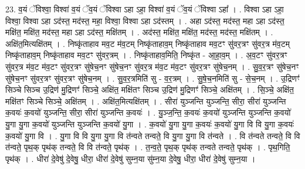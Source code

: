 \documentclass[17pt]{extarticle}
\begin{document}
23. व॒यं ॅविश्वा॒ विश्वा॑ व॒यं ॅव॒यं ॅविश्वा ऽहा ऽहा॒ विश्वा॑ व॒यं ॅव॒यं ॅविश्वा ऽहा᳚ । . विश्वा ऽहा ऽहा॒ विश्वा॒ विश्वा ऽहा ऽद॑स्त॒ मद॑स्त॒ महा॒ विश्वा॒ विश्वा ऽहा ऽद॑स्तम् । . अहा ऽद॑स्त॒ मद॑स्त॒ महा ऽहा ऽद॑स्त॒ मक्षि॑त॒ मक्षि॑त॒ मद॑स्त॒ महा ऽहा ऽद॑स्त॒ मक्षि॑तम् । . अद॑स्त॒ मक्षि॑त॒ मक्षि॑त॒ मद॑स्त॒ मद॑स्त॒ मक्षि॑तम् । . अक्षि॑त॒मित्यक्षि॑तम् । . निष्कृ॑ताहाव मव॒ट म॑व॒टम् निष्कृ॑ताहाव॒म् निष्कृ॑ताहाव मव॒टꣳ सु॑वर॒त्रꣳ सु॑वर॒त्र म॑व॒टम् निष्कृ॑ताहाव॒म् निष्कृ॑ताहाव मव॒टꣳ सु॑वर॒त्रम् । . निष्कृ॑ताहाव॒मिति॒ निष्कृ॑त - आ॒हा॒व॒म् । . अ॒व॒टꣳ सु॑वर॒त्रꣳ सु॑वर॒त्र म॑व॒ट म॑व॒टꣳ सु॑वर॒त्रꣳ सु॑षेच॒नꣳ सु॑षेच॒नꣳ सु॑वर॒त्र म॑व॒ट म॑व॒टꣳ सु॑वर॒त्रꣳ सु॑षेच॒नम् । . सु॒व॒र॒त्रꣳ सु॑षेच॒नꣳ सु॑षेच॒नꣳ सु॑वर॒त्रꣳ सु॑वर॒त्रꣳ सु॑षेच॒नम् । . सु॒व॒र॒त्रमिति॑ सु - व॒र॒त्रम् । . सु॒षे॒च॒नमिति॑ सु - से॒च॒नम् । . उ॒द्रिणꣳ॑ सिञ्चे सिञ्च उ॒द्रिण॑ मु॒द्रिणꣳ॑ सिञ्चे॒ अक्षि॑त॒ मक्षि॑तꣳ सिञ्च उ॒द्रिण॑ मु॒द्रिणꣳ॑ सिञ्चे॒ अक्षि॑तम् । . सि॒ञ्चे॒ अक्षि॑त॒ मक्षि॑तꣳ सिञ्चे सिञ्चे॒ अक्षि॑तम् । . अक्षि॑त॒मित्यक्षि॑तम् । . सीरा॑ युञ्जन्ति युञ्जन्ति॒ सीरा॒ सीरा॑ युञ्जन्ति क॒वयः॑ क॒वयो॑ युञ्जन्ति॒ सीरा॒ सीरा॑ युञ्जन्ति क॒वयः॑ । . यु॒ञ्ज॒न्ति॒ क॒वयः॑ क॒वयो॑ युञ्जन्ति युञ्जन्ति क॒वयो॑ यु॒गा यु॒गा क॒वयो॑ युञ्जन्ति युञ्जन्ति क॒वयो॑ यु॒गा । . क॒वयो॑ यु॒गा यु॒गा क॒वयः॑ क॒वयो॑ यु॒गा वि वि यु॒गा क॒वयः॑ क॒वयो॑ यु॒गा वि । . यु॒गा वि वि यु॒गा यु॒गा वि त॑न्वते तन्वते॒ वि यु॒गा यु॒गा वि त॑न्वते । . वि त॑न्वते तन्वते॒ वि वि त॑न्वते॒ पृथ॒क् पृथ॑क् तन्वते॒ वि वि त॑न्वते॒ पृथ॑क् । . त॒न्व॒ते॒ पृथ॒क् पृथ॑क् तन्वते तन्वते॒ पृथ॑क् । . पृथ॒गिति॒ पृथ॑क् । . धीरा॑ दे॒वेषु॑ दे॒वेषु॒ धीरा॒ धीरा॑ दे॒वेषु॑ सुम्न॒या सु॑म्न॒या दे॒वेषु॒ धीरा॒ धीरा॑ दे॒वेषु॑ सुम्न॒या । \newline
\end{document}
